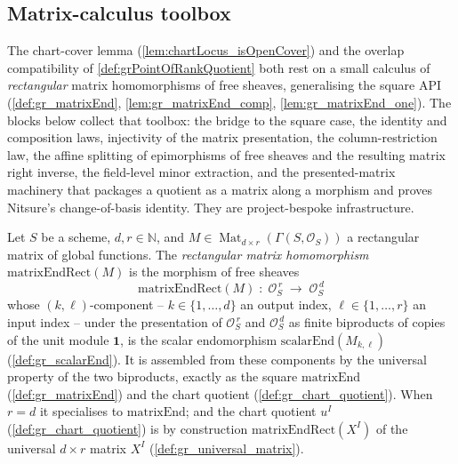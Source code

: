 \subsection{Matrix-calculus toolbox}

The chart-cover lemma (\cref{lem:chartLocus_isOpenCover}) and the overlap compatibility of
\cref{def:grPointOfRankQuotient} both rest on a small calculus of \emph{rectangular} matrix
homomorphisms of free sheaves, generalising the square API
(\cref{def:gr_matrixEnd}, \cref{lem:gr_matrixEnd_comp}, \cref{lem:gr_matrixEnd_one}). The
blocks below collect that toolbox: the bridge to the square case, the identity and
composition laws, injectivity of the matrix presentation, the column-restriction law, the
affine splitting of epimorphisms of free sheaves and the resulting matrix right inverse, the
field-level minor extraction, and the presented-matrix machinery that packages a quotient as
a matrix along a morphism and proves Nitsure's change-of-basis identity. They are
project-bespoke infrastructure.


\begin{definition}\leanok
  \label{def:gr_matrixEndRect}
  Let \(S\) be a scheme, \(d, r \in \mathbb{N}\), and
  \(M \in \operatorname{Mat}_{d \times r}(\Gamma(S, \mathcal{O}_S))\) a rectangular matrix
  of global functions. The \emph{rectangular matrix homomorphism}
  \(\mathrm{matrixEndRect}(M)\) is the morphism of free sheaves
  \[
    \mathrm{matrixEndRect}(M) \;:\; \mathcal{O}_S^{\,r}
      \;\longrightarrow\; \mathcal{O}_S^{\,d}
  \]
  whose \((k,\ell)\)-component -- \(k \in \{1,\dots,d\}\) an output index,
  \(\ell \in \{1,\dots,r\}\) an input index -- under the presentation of
  \(\mathcal{O}_S^{\,r}\) and \(\mathcal{O}_S^{\,d}\) as finite biproducts of copies of the
  unit module \(\mathbf 1\), is the scalar endomorphism \(\mathrm{scalarEnd}(M_{k,\ell})\)
  (\cref{def:gr_scalarEnd}). It is assembled from these components by the universal property
  of the two biproducts, exactly as the square \(\mathrm{matrixEnd}\)
  (\cref{def:gr_matrixEnd}) and the chart quotient (\cref{def:gr_chart_quotient}). When
  \(r = d\) it specialises to \(\mathrm{matrixEnd}\); and the chart quotient \(u^I\)
  (\cref{def:gr_chart_quotient}) is by construction \(\mathrm{matrixEndRect}(X^I)\) of the
  universal \(d \times r\) matrix \(X^I\) (\cref{def:gr_universal_matrix}).
\end{definition}

